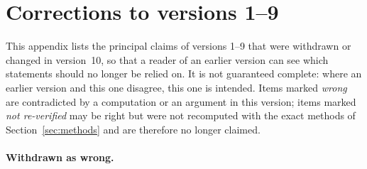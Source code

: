 \section{Corrections to versions 1--9}\label{sec:corrections}

This appendix lists the principal claims of versions 1--9 that were withdrawn or changed in
version~10, so that a reader of an earlier version can see which statements should no longer be
relied on.  It is not guaranteed
complete: where an earlier version and this one disagree, this one is intended.  Items marked \emph{wrong} are
contradicted by a computation or an argument in this version; items marked \emph{not
re-verified} may be right but were not recomputed with the exact methods of
Section~\ref{sec:methods} and are therefore no longer claimed.

\paragraph{Withdrawn as wrong.}
